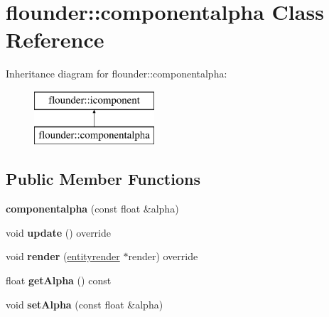 \hypertarget{classflounder_1_1componentalpha}{}\section{flounder\+:\+:componentalpha Class Reference}
\label{classflounder_1_1componentalpha}
Inheritance diagram for flounder\+:\+:componentalpha\+:\begin{figure}[H]
\begin{center}
\leavevmode
\includegraphics[height=2.000000cm]{classflounder_1_1componentalpha}
\end{center}
\end{figure}
\subsection*{Public Member Functions}
\begin{DoxyCompactItemize}
\item 
\mbox{\label{classflounder_1_1componentalpha_a2a17cd18805b75412cba03d8a7548008}} 
{\bfseries componentalpha} (const float \&alpha)
\item 
\mbox{\label{classflounder_1_1componentalpha_ac4ee13545e7414cef26136377dcbbe90}} 
void {\bfseries update} () override
\item 
\mbox{\label{classflounder_1_1componentalpha_a7aff2ddc63d0851e0c581e0d8de4d42d}} 
void {\bfseries render} (\hyperlink{structflounder_1_1entityrender}{entityrender} $\ast$render) override
\item 
\mbox{\label{classflounder_1_1componentalpha_a53215e826d4e23d232735e2006d0477d}} 
float {\bfseries get\+Alpha} () const
\item 
\mbox{\label{classflounder_1_1componentalpha_ae2a29f176b993b5e8dc0ef973ac96bbb}} 
void {\bfseries set\+Alpha} (const float \&alpha)
\end{DoxyCompactItemize}
